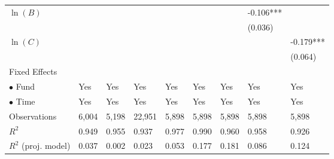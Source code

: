 \documentclass[openany]{book}
\theoremstyle{definition}
\theoremstyle{definition}
\theoremstyle{definition}
\theoremstyle{remark}
\begin{document}
\begin{table}[ht]
\begin{tabularx}{0.975\textwidth}{lYYYYYYYY}
  $\ln(B)$ &  &  &  &  &  &  & -0.106*** &  \\ 
   &  &  &  &  &  &  & (0.036) &  \\ 
  $\ln(C)$ &  &  &  &  &  &  &  & -0.179*** \\ 
   &  &  &  &  &  &  &  & (0.064) \\ 
  Fixed Effects &  &  &  &  &  &  &  &  \\ 
  $\bullet$ Fund & Yes & Yes & Yes & Yes & Yes & Yes & Yes & Yes \\ 
  $\bullet$ Time & Yes & Yes & Yes & Yes & Yes & Yes & Yes & Yes \\ 
  Observations & 6,004 & 5,198 & 22,951 & 5,898 & 5,898 & 5,898 & 5,898 & 5,898 \\ 
  $R^2$ & 0.949 & 0.955 & 0.937 & 0.977 & 0.990 & 0.960 & 0.958 & 0.926 \\ 
  $R^2$ (proj. model) & 0.037 & 0.002 & 0.023 & 0.053 & 0.177 & 0.181 & 0.086 & 0.124 \\ 
   \bottomrule
\end{tabularx}
\endgroup
\end{table}
\end{document}
